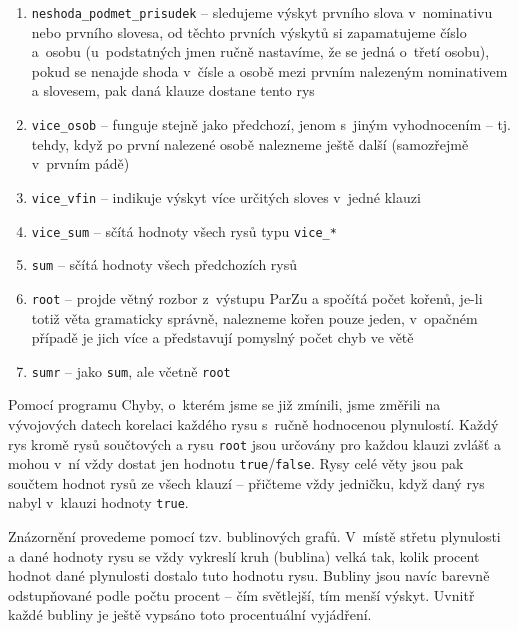 \documentclass[12pt,a4paper]{report}
\begin{document}
\begin{enumerate}
\item{\texttt{neshoda\_podmet\_prisudek} -- sledujeme výskyt prvního slova v~nominativu nebo prvního slovesa, od těchto prvních výskytů si zapamatujeme číslo a~osobu (u~podstatných jmen ručně nastavíme, že se jedná o~třetí osobu), pokud se nenajde shoda v~čísle a osobě mezi prvním nalezeným nominativem a slovesem, pak daná klauze dostane tento rys}
\item{\texttt{vice\_osob} -- funguje stejně jako předchozí, jenom s~jiným vyhodnocením -- tj. tehdy, když po první nalezené osobě nalezneme ještě další (samozřejmě v~prvním pádě)}
\item{\texttt{vice\_vfin} -- indikuje výskyt více určitých sloves v~jedné klauzi}
\item{\texttt{vice\_sum} -- sčítá hodnoty všech rysů typu \texttt{vice\_*}}
\item{\texttt{sum} -- sčítá hodnoty všech předchozích rysů}
\item{\texttt{root} -- projde větný rozbor z~výstupu ParZu a spočítá počet kořenů, je-li totiž věta gramaticky správně, nalezneme kořen pouze jeden, v~opačném případě je jich více a představují pomyslný počet chyb ve větě}
\item{\texttt{sumr} -- jako \texttt{sum}, ale včetně \texttt{root}}
\end{enumerate}

Pomocí programu Chyby, o~kterém jsme se již zmínili, jsme změřili na vývojových datech korelaci každého rysu s~ručně hodnocenou plynulostí. Každý rys kromě rysů součtových a rysu \texttt{root} jsou určovány pro každou klauzi zvlášť a mohou v~ní vždy dostat jen hodnotu \texttt{true}/\texttt{false}. Rysy celé věty jsou pak součtem hodnot rysů ze všech klauzí -- přičteme vždy jedničku, když daný rys nabyl v~klauzi hodnoty \texttt{true}.

Znázornění provedeme pomocí tzv. bublinových grafů. V~místě střetu plynulosti a dané hodnoty rysu se vždy vykreslí kruh (bublina) velká tak, kolik procent hodnot dané plynulosti dostalo tuto hodnotu rysu. Bubliny jsou navíc barevně odstupňované podle počtu procent -- čím světlejší, tím menší výskyt. Uvnitř každé bubliny je ještě vypsáno toto procentuální vyjádření.
\end{document}
